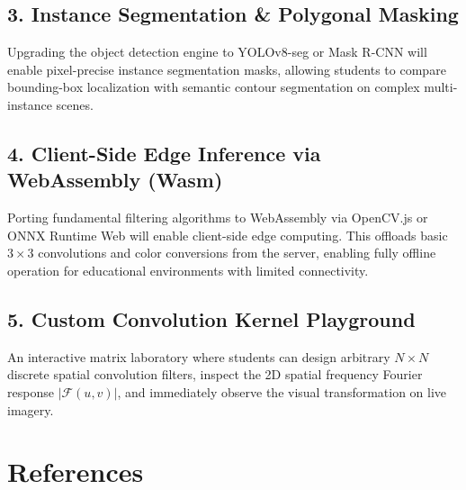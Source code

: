 \subsection{3. Instance Segmentation \& Polygonal Masking}
Upgrading the object detection engine to YOLOv8-seg or Mask R-CNN will enable pixel-precise instance segmentation masks, allowing students to compare bounding-box localization with semantic contour segmentation on complex multi-instance scenes.

\subsection{4. Client-Side Edge Inference via WebAssembly (Wasm)}
Porting fundamental filtering algorithms to WebAssembly via OpenCV.js or ONNX Runtime Web will enable client-side edge computing. This offloads basic $3\times3$ convolutions and color conversions from the server, enabling fully offline operation for educational environments with limited connectivity.

\subsection{5. Custom Convolution Kernel Playground}
An interactive matrix laboratory where students can design arbitrary $N \times N$ discrete spatial convolution filters, inspect the 2D spatial frequency Fourier response $|\mathcal{F}(u,v)|$, and immediately observe the visual transformation on live imagery.

\clearpage

\section{References}


